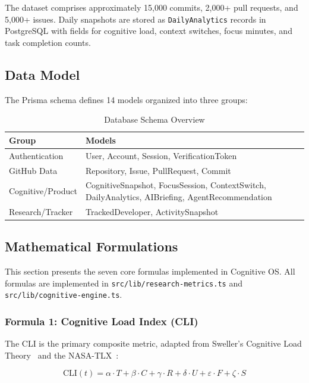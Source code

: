 \documentclass[12pt]{article}
\begin{document}
The dataset comprises approximately 15,000 commits, 2,000+ pull requests, and 5,000+ issues. Daily snapshots are stored as \texttt{DailyAnalytics} records in PostgreSQL with fields for cognitive load, context switches, focus minutes, and task completion counts.

\subsection{Data Model}

The Prisma schema defines 14 models organized into three groups:

\begin{table}[H]
\centering
\caption{Database Schema Overview}
\label{tab:schema}
\begin{tabular}{@{}lp{10cm}@{}}
\toprule
\textbf{Group} & \textbf{Models} \\
\midrule
Authentication & User, Account, Session, VerificationToken \\
GitHub Data    & Repository, Issue, PullRequest, Commit \\
Cognitive/Product & CognitiveSnapshot, FocusSession, ContextSwitch, DailyAnalytics, AIBriefing, AgentRecommendation \\
Research/Tracker & TrackedDeveloper, ActivitySnapshot \\
\bottomrule
\end{tabular}
\end{table}

\subsection{Mathematical Formulations}

This section presents the seven core formulas implemented in Cognitive OS. All formulas are implemented in \texttt{src/lib/research-metrics.ts} and \texttt{src/lib/cognitive-engine.ts}.

\subsubsection{Formula 1: Cognitive Load Index (CLI)}

The CLI is the primary composite metric, adapted from Sweller's Cognitive Load Theory~\cite{sweller1988cognitive} and the NASA-TLX~\cite{hart1988development}:

\begin{equation}
\text{CLI}(t) = \alpha \cdot T + \beta \cdot C + \gamma \cdot R + \delta \cdot U + \varepsilon \cdot F + \zeta \cdot S
\label{eq:cli}
\end{equation}
\end{document}
